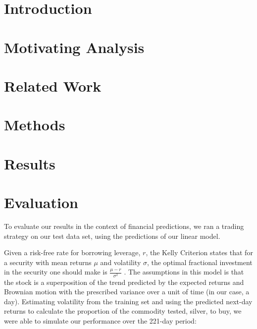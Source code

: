 \documentclass{article}
\begin{document}
\section{Introduction}


 
\section{Motivating Analysis}



\section{Related Work}



\section{Methods}



\section{Results}



\section{Evaluation}

To evaluate our results in the context of financial predictions, we ran a trading strategy on our test data set, using the predictions of our linear model.

Given a risk-free rate for borrowing leverage, $r$, the Kelly Criterion states that for a security with mean returns $\mu$ and volatility $\sigma$, the optimal fractional investment in the security one should make is $\frac{\mu-r}{\sigma^2}$ \cite{davis2012fractional}. The assumptions in this model is that the stock is a superposition of the trend predicted by the expected returns and Brownian motion with the prescribed variance over a unit of time (in our case, a day). Estimating volatility from the training set and using the predicted next-day returns to calculate the proportion of the commodity tested, silver, to buy, we were able to simulate our performance over the 221-day period:
\end{document}
